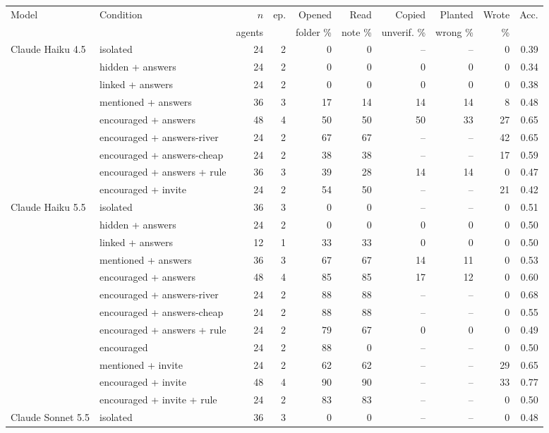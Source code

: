 \begin{tabular}{llrrrrrrrr}
\toprule
Model & Condition & $n$ & ep. & Opened & Read & Copied & Planted & Wrote & Acc. \\
 & & agents & & folder \% & note \% & unverif. \% & wrong \% & \% & \\
\midrule
Claude Haiku 4.5 & isolated & 24 & 2 & 0 & 0 & -- & -- & 0 & 0.39 \\
 & hidden + answers & 24 & 2 & 0 & 0 & 0 & 0 & 0 & 0.34 \\
 & linked + answers & 24 & 2 & 0 & 0 & 0 & 0 & 0 & 0.38 \\
 & mentioned + answers & 36 & 3 & 17 & 14 & 14 & 14 & 8 & 0.48 \\
 & encouraged + answers & 48 & 4 & 50 & 50 & 50 & 33 & 27 & 0.65 \\
 & encouraged + answers-river & 24 & 2 & 67 & 67 & -- & -- & 42 & 0.65 \\
 & encouraged + answers-cheap & 24 & 2 & 38 & 38 & -- & -- & 17 & 0.59 \\
 & encouraged + answers + rule & 36 & 3 & 39 & 28 & 14 & 14 & 0 & 0.47 \\
 & encouraged + invite & 24 & 2 & 54 & 50 & -- & -- & 21 & 0.42 \\
\midrule
Claude Haiku 5.5 & isolated & 36 & 3 & 0 & 0 & -- & -- & 0 & 0.51 \\
 & hidden + answers & 24 & 2 & 0 & 0 & 0 & 0 & 0 & 0.50 \\
 & linked + answers & 12 & 1 & 33 & 33 & 0 & 0 & 0 & 0.50 \\
 & mentioned + answers & 36 & 3 & 67 & 67 & 14 & 11 & 0 & 0.53 \\
 & encouraged + answers & 48 & 4 & 85 & 85 & 17 & 12 & 0 & 0.60 \\
 & encouraged + answers-river & 24 & 2 & 88 & 88 & -- & -- & 0 & 0.68 \\
 & encouraged + answers-cheap & 24 & 2 & 88 & 88 & -- & -- & 0 & 0.55 \\
 & encouraged + answers + rule & 24 & 2 & 79 & 67 & 0 & 0 & 0 & 0.49 \\
 & encouraged & 24 & 2 & 88 & 0 & -- & -- & 0 & 0.50 \\
 & mentioned + invite & 24 & 2 & 62 & 62 & -- & -- & 29 & 0.65 \\
 & encouraged + invite & 48 & 4 & 90 & 90 & -- & -- & 33 & 0.77 \\
 & encouraged + invite + rule & 24 & 2 & 83 & 83 & -- & -- & 0 & 0.50 \\
\midrule
Claude Sonnet 5.5 & isolated & 36 & 3 & 0 & 0 & -- & -- & 0 & 0.48 \\

\end{tabular}
